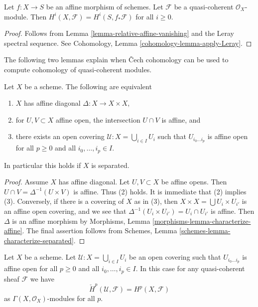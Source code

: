 \begin{lemma}
\label{lemma-relative-affine-cohomology}
Let $f : X \to S$ be an affine morphism of schemes.
Let $\mathcal{F}$ be a quasi-coherent $\mathcal{O}_X$-module.
Then $H^i(X, \mathcal{F}) = H^i(S, f_*\mathcal{F})$ for all $i \geq 0$.
\end{lemma}

\begin{proof}
Follows from Lemma \ref{lemma-relative-affine-vanishing}
and the Leray spectral sequence. See
Cohomology, Lemma \ref{cohomology-lemma-apply-Leray}.
\end{proof}

\noindent
The following two lemmas explain when {\v C}ech cohomology
can be used to compute cohomology of quasi-coherent modules.

\begin{lemma}
\label{lemma-affine-diagonal}
Let $X$ be a scheme. The following are equivalent
\begin{enumerate}
\item $X$ has affine diagonal $\Delta : X \to X \times X$,
\item for $U, V \subset X$ affine open, the intersection
$U \cap V$ is affine, and
\item there exists an open covering $\mathcal{U} : X = \bigcup_{i \in I} U_i$
such that $U_{i_0 \ldots i_p}$ is affine open for all $p \ge 0$ and all
$i_0, \ldots, i_p \in I$.
\end{enumerate}
In particular this holds if $X$ is separated.
\end{lemma}

\begin{proof}
Assume $X$ has affine diagonal. Let $U, V \subset X$ be affine opens.
Then $U \cap V = \Delta^{-1}(U \times V)$ is affine. Thus (2) holds.
It is immediate that (2) implies (3). Conversely, if there is a
covering of $X$ as in (3), then $X \times X = \bigcup U_i \times U_{i'}$
is an affine open covering, and we see that
$\Delta^{-1}(U_i \times U_{i'}) = U_i \cap U_{i'}$
is affine. Then $\Delta$ is an affine morphism by
Morphisms, Lemma \ref{morphisms-lemma-characterize-affine}.
The final assertion follows from Schemes, Lemma
\ref{schemes-lemma-characterize-separated}.
\end{proof}

\begin{lemma}
\label{lemma-cech-cohomology-quasi-coherent}
Let $X$ be a scheme.
Let $\mathcal{U} : X = \bigcup_{i \in I} U_i$ be an open covering such that
$U_{i_0 \ldots i_p}$ is affine open for all $p \ge 0$ and all
$i_0, \ldots, i_p \in I$.
In this case for any quasi-coherent sheaf $\mathcal{F}$ we have
$$
\check{H}^p(\mathcal{U}, \mathcal{F}) = H^p(X, \mathcal{F})
$$
as $\Gamma(X, \mathcal{O}_X)$-modules for all $p$.
\end{lemma}

